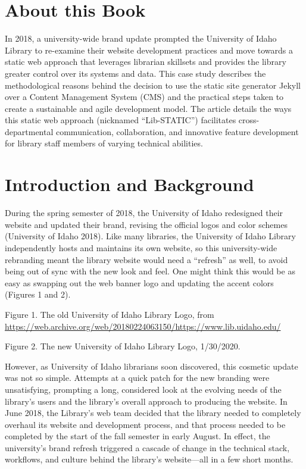 \documentclass{book}
\begin{document}
\chapter*{About this Book}
In 2018, a university-wide brand update prompted the University of Idaho
Library to re-examine their website development practices and move towards a
static web approach that leverages librarian skillsets and provides the
library greater control over its systems and data. This case study describes
the methodological reasons behind the decision to use the static site
generator Jekyll over a Content Management System (CMS) and the practical
steps taken to create a sustainable and agile development model. The article
details the ways this static web approach (nicknamed ``Lib-STATIC'')
facilitates cross-departmental communication, collaboration, and innovative
feature development for library staff members of varying technical abilities.

\setcounter{tocdepth}{3}
\tableofcontents

\mainmatter

\hypertarget{introduction-and-background}{%
\chapter{Introduction and Background}\label{introduction-and-background}}

During the spring semester of 2018, the University of Idaho redesigned their
website and updated their brand, revising the official logos and color schemes
(University of Idaho 2018). Like many libraries, the University of Idaho
Library independently hosts and maintains its own website, so this
university-wide rebranding meant the library website would need a ``refresh''
as well, to avoid being out of sync with the new look and feel. One might
think this would be as easy as swapping out the web banner logo and updating
the accent colors (Figures 1 and 2).

Figure 1. The old University of Idaho Library Logo, from
\url{https://web.archive.org/web/20180224063150/https://www.lib.uidaho.edu/}

Figure 2. The new University of Idaho Library Logo, 1/30/2020.

However, as University of Idaho librarians soon discovered, this cosmetic
update was not so simple. Attempts at a quick patch for the new branding were
unsatisfying, prompting a long, considered look at the evolving needs of the
library's users and the library's overall approach to producing the website.
In June 2018, the Library's web team decided that the library needed to
completely overhaul its website and development process, and that process
needed to be completed by the start of the fall semester in early August. In
effect, the university's brand refresh triggered a cascade of change in the
technical stack, workflows, and culture behind the library's website---all in
a few short months.
\end{document}
